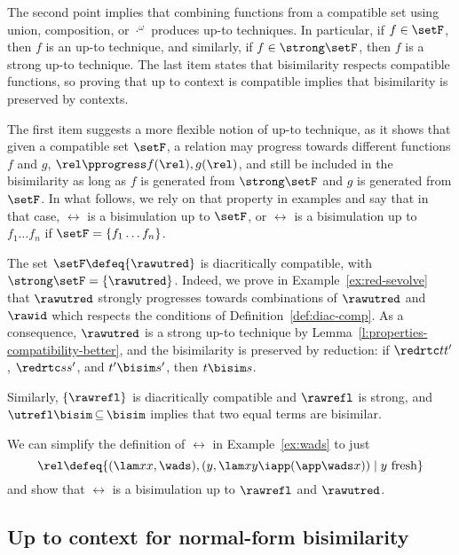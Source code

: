 \documentclass{lmcs}
\theoremstyle{defC}
\begin{document}
\noindent The second point implies that combining functions from a compatible
set using union, composition, or $\cdot^\omega$ produces up-to techniques. In
particular, if $f \in \setF$, then $f$ is an up-to technique, and similarly, if
$f \in \strong\setF$, then $f$ is a strong up-to technique. The last item states
that bisimilarity respects compatible functions, so proving that up to context
is compatible implies that bisimilarity is preserved by contexts.

The first item suggests a more flexible notion of up-to technique, as it shows
that given a compatible set $\setF$, a relation may progress towards different
functions $f$ and $g$, $\rel \pprogress f(\rel), g(\rel)$, and still be included
in the bisimilarity as long as $f$ is generated from $\strong\setF$ and $g$ is
generated from $\setF$. In what follows, we rely on that property in examples
and say that in that case, $\rel$ is a bisimulation up to $\setF$, or $\rel$ is
a bisimulation up to $f_1 \ldots f_n$ if $\setF = \{ f_1 \ldots f_n \}$.

\begin{exa}
  The set $\setF \defeq \{ \rawutred \}$ is diacritically compatible, with
  $\strong \setF = \{ \rawutred \}$. Indeed, we prove in
  Example~\ref{ex:red-sevolve} that $\rawutred$ strongly progresses towards
  combinations of $\rawutred$ and $\rawid$ which respects the conditions of
  Definition~\ref{def:diac-comp}. As a consequence, $\rawutred$ is a strong
  up-to technique by Lemma~\ref{l:properties-compatibility-better}, and the
  bisimilarity is preserved by reduction: if $\redrtc t {t'}$, $\redrtc s {s'}$,
  and $t' \bisim s'$, then $t \bisim s$.

  Similarly, $\{ \rawrefl \}$ is diacritically compatible and $\rawrefl$ is
  strong, and $\utrefl \bisim \mathop\subseteq \bisim$ implies that two equal
  terms are bisimilar.
\end{exa}

\begin{exa}%
  \label{ex:wads-refl-red}
  We can simplify the definition of $\rel$ in Example~\ref{ex:wads} to just
  \[\mathord{\rel} \defeq \{ (\lam x x, \wads), (y, \lam x {y \iapp (\app \wads
      x)}) \mid y \mbox{ fresh} \}\] and show that $\rel$ is a bisimulation up
  to $\rawrefl$ and $\rawutred$.
\end{exa}


\subsection{Up to context for normal-form bisimilarity}%
\label{ss:lamcal-up-to-nf}
\end{document}
